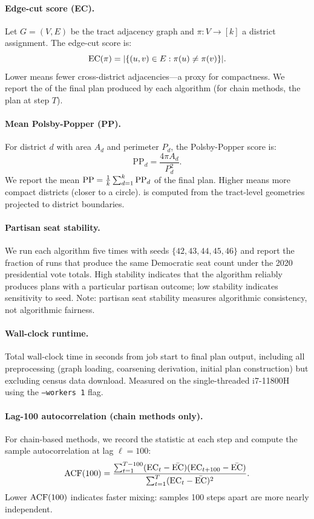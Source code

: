 \paragraph{Edge-cut score (EC).}
Let $G = (V, E)$ be the tract adjacency graph and $\pi : V \to [k]$
a district assignment.
The edge-cut score is:
\[
  \mathrm{EC}(\pi) = |\{(u,v) \in E : \pi(u) \neq \pi(v)\}|.
\]
Lower \ec{} means fewer cross-district adjacencies---a proxy for
compactness.
We report the \ec{} of the final plan produced by each algorithm
(for chain methods, the plan at step $T$).

\paragraph{Mean Polsby-Popper (PP).}
For district $d$ with area $A_d$ and perimeter $P_d$, the Polsby-Popper
score is:
\[
  \mathrm{PP}_d = \frac{4\pi A_d}{P_d^2}.
\]
We report the mean $\mathrm{PP} = \frac{1}{k} \sum_{d=1}^k \mathrm{PP}_d$ of the
final plan.
Higher \pp{} means more compact districts (closer to a circle).
\pp{} is computed from the tract-level geometries projected to district
boundaries.

\paragraph{Partisan seat stability.}
We run each algorithm five times with seeds $\{42, 43, 44, 45, 46\}$ and
report the fraction of runs that produce the same Democratic seat count
under the 2020 presidential vote totals.
High stability indicates that the algorithm reliably produces plans with a
particular partisan outcome; low stability indicates sensitivity to
seed.
Note: partisan seat stability measures algorithmic consistency, not
algorithmic fairness.

\paragraph{Wall-clock runtime.}
Total wall-clock time in seconds from job start to final plan output,
including all preprocessing (graph loading, coarsening derivation, initial
plan construction) but excluding census data download.
Measured on the single-threaded i7-11800H using the
\texttt{--workers~1} flag.

\paragraph{Lag-100 autocorrelation (chain methods only).}
For chain-based methods, we record the \ec{} statistic at each step and
compute the sample autocorrelation at lag $\ell = 100$:
\[
  \mathrm{ACF}(100) = \frac{\sum_{t=1}^{T-100} (\mathrm{EC}_t - \bar{\mathrm{EC}})
                    (\mathrm{EC}_{t+100} - \bar{\mathrm{EC}})}
                   {\sum_{t=1}^{T} (\mathrm{EC}_t - \bar{\mathrm{EC}})^2}.
\]
Lower $\mathrm{ACF}(100)$ indicates faster mixing: samples 100 steps apart are
more nearly independent.

